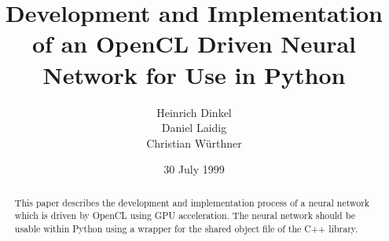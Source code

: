 \documentclass{acm_proc_article-sp}
\begin{document}
\title{Development and Implementation of an OpenCL Driven Neural Network for Use in Python}
%
%
%
%
%

%
\author{
%
%
\alignauthor Heinrich Dinkel\\
\alignauthor Daniel Laidig\\
\alignauthor Christian Würthner\\
}

\date{30 July 1999}
\maketitle
\begin{abstract}
This paper describes the development and implementation process of a neural network which is driven by OpenCL using GPU acceleration. The neural network should be usable within Python using a wrapper for the shared object file of the C++ library. 
\end{abstract}
\end{document}
